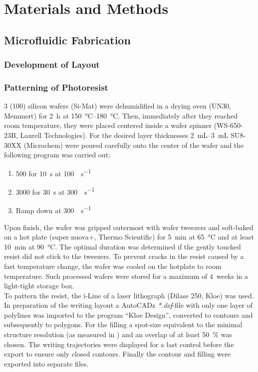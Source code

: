 \chapter{Materials and Methods}

\section{Microfluidic Fabrication}

\subsection{Development of Layout}

\subsection{Patterning of Photoresist}
\SI{3}{\inch} (100) silicon wafers (Si-Mat) were dehumidified in a drying oven (UN30, Memmert) for \SI{2}{\hour} at \SIrange{150}{180}{\degreeCelsius}. Then, immediately after they reached room temperature, they were placed centered inside a wafer spinner (WS-650-23B, Laurell Technologies). For the desired layer thicknesses \SIrange{2}{3}{\milli\liter} SU8-30XX (Microchem) were poured carefully onto the center of the wafer and the following program was carried out:
\begin{enumerate}[noitemsep]
\item \SI{500}{\rpm} for \SI{10}{s} at \SI{100}{\rpm\per\second}
\item \SI{3000}{\rpm} for \SI{30}{s} at \SI{300}{\rpm\per\second}
\item Ramp down at \SI{300}{\rpm\per\second}
\end{enumerate}
Upon finish, the wafer was gripped outermost with wafer tweezers and soft-baked on a hot plate (super nuova+, Thermo Scientific) for \SI{5}{\minute} at \SI{65}{\degreeCelsius} and at least \SI{10}{\minute} at \SI{90}{\degreeCelsius}. The optimal duration was determined if the gently touched resist did not stick to the tweezers. To prevent cracks in the resist caused by a fast temperature change, the wafer was cooled on the hotplate to room	temperature. Such processed wafers were stored for a maximum of \SI{4}{weeks} in a light-tight storage box.\\
To pattern the resist, the i-Line of a laser lithograph (Dilase 250, Kloe) was used. In preparation of the writing layout a AutoCADz \textit{*.dxf}-file with only one layer of polylines was imported to the program ``Kloe Design'', converted to contours and subsequently to polygons. For the filling a spot-size equivalent to the minimal structure resolution (as measured in \citet{lit:tech:rojda2020}) and an overlap of at least \SI{50}{\percent} was chosen. The writing trajectories were displayed for a last control before the export to ensure only closed contours. Finally the contour and filling were exported into separate files.\\
